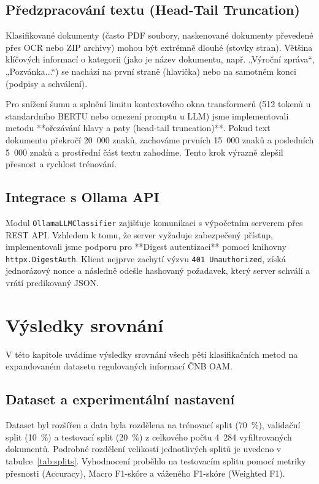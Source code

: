 \documentclass[czech, oth, kky, he, iso690alph, pdf, viewonly]{fasthesis}%
\begin{document}
\section{Předzpracování textu (Head-Tail Truncation)}
Klasifikované dokumenty (často PDF soubory, naskenované dokumenty převedené přes OCR nebo ZIP archivy) mohou být extrémně dlouhé (stovky stran). Většina klíčových informací o kategorii (jako je název dokumentu, např. „Výroční zpráva“, „Pozvánka...“) se nachází na první straně (hlavička) nebo na samotném konci (podpisy a schválení). 

Pro snížení šumu a splnění limitu kontextového okna transformerů (512 tokenů u standardního BERTU nebo omezení promptu u LLM) jsme implementovali metodu **ořezávání hlavy a paty (head-tail truncation)**. Pokud text dokumentu překročí 20~000 znaků, zachováme prvních 15~000 znaků a posledních 5~000 znaků a prostřední část textu zahodíme. Tento krok výrazně zlepšil přesnost a rychlost trénování.

\section{Integrace s Ollama API}
Modul \texttt{OllamaLLMClassifier} zajišťuje komunikaci s výpočetním serverem přes REST API. Vzhledem k tomu, že server vyžaduje zabezpečený přístup, implementovali jsme podporu pro **Digest autentizaci** pomocí knihovny \texttt{httpx.DigestAuth}. Klient nejprve zachytí výzvu \texttt{401 Unauthorized}, získá jednorázový nonce a následně odešle hashovaný požadavek, který server schválí a vrátí predikovaný JSON.

\chapter{Výsledky srovnání}
V této kapitole uvádíme výsledky srovnání všech pěti klasifikačních metod na expandovaném datasetu regulovaných informací ČNB OAM.

\section{Dataset a experimentální nastavení}
Dataset byl rozšířen a data byla rozdělena na trénovací split (70~\%), validační split (10~\%) a testovací split (20~\%) z celkového počtu 4~284 vyfiltrovaných dokumentů. Podrobné rozdělení velikostí jednotlivých splitů je uvedeno v tabulce~\ref{tab:splits}. Vyhodnocení proběhlo na testovacím splitu pomocí metriky přesnosti (Accuracy), Macro F1-skóre a váženého F1-skóre (Weighted F1).
\end{document}
